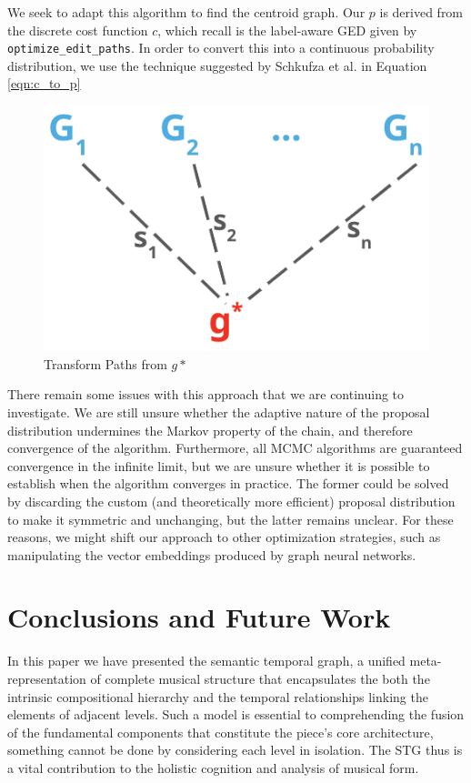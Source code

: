 \documentclass{article}
\begin{document}
We seek to adapt this algorithm to find the centroid graph. Our $p$ is derived from the discrete cost function $c$, which recall is the label-aware GED given by \verb!optimize_edit_paths!. In order to convert this into a continuous probability distribution, we use the technique suggested by Schkufza et al. \cite{cacm} in Equation \ref{eqn:c_to_p}

 \begin{figure}[h!]
  \centering
  \includegraphics[width=0.4\linewidth]{figs/proposal_dist}
  \caption{Transform Paths from $g*$}
  \label{fig:proposal_dist}
\end{figure}

There remain some issues with this approach that we are continuing to investigate.  We are still unsure whether the adaptive nature of the proposal distribution undermines the Markov property of the chain, and therefore convergence of the algorithm. Furthermore, all MCMC algorithms are guaranteed convergence in the infinite limit, but we are unsure whether it is possible to establish when the algorithm converges in practice. The former could be solved by discarding the custom (and theoretically more efficient) proposal distribution to make it symmetric and unchanging, but the latter remains unclear. For these reasons, we might shift our approach to other optimization strategies, such as manipulating the vector embeddings produced by graph neural networks. 
 

\section{Conclusions and Future Work}
In this paper we have presented the semantic temporal graph, a unified meta-representation of complete musical structure that encapsulates the both the intrinsic compositional hierarchy and the temporal relationships linking the elements of adjacent levels. Such a model is essential to comprehending the fusion of the fundamental components that constitute the piece's core architecture, something cannot be done by considering each level in isolation. The STG thus is a vital contribution to the holistic cognition and analysis of musical form. 
\end{document}
